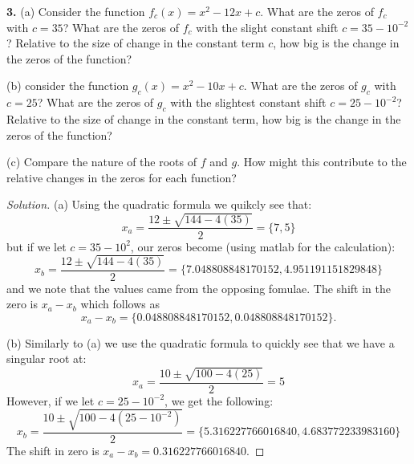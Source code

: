 \documentclass[12pt]{amsart}
\newenvironment{solution}
{\begin{proof}[Solution]}
{\end{proof}}
\begin{document}
\begin{onehalfspace}
        \textbf{3.} (a) Consider the function $f_c(x) = x^2 -12x + c$. What are the zeros of $f_c$ with $c = 35$? What
        are the zeros of $f_c$ with the slight constant shift $c = 35 - 10^{-2}$? Relative to the size of change in
        the constant term $c$, how big is the change in the zeros of the function?

        (b) consider the function $g_c(x) = x^2 - 10x + c$. What are the zeros of $g_c$ with $c = 25$? What are the
        zeros of $g_c$ with the slightest constant shift $c = 25 - 10^{-2}$? Relative to the size of change in the
        constant term, how big is the change in the zeros of the function?

        (c) Compare the nature of the roots of $f$ and $g$. How might this contribute to the relative changes in the
        zeros for each function?
        \begin{solution}
            (a) Using the quadratic formula we quikcly see that:
            \begin{displaymath}
                x_a = \frac{12 \pm \sqrt{144 - 4(35)}}{2} = \{7, 5\}
            \end{displaymath}
            but if we let $c = 35-10^2$, our zeros become (using matlab for the calculation):
            \begin{displaymath}
                x_b = \frac{12 \pm \sqrt{144 - 4(35)}}{2} = \{7.048808848170152,4.951191151829848\}
            \end{displaymath}
            and we note that the values came from the opposing fomulae. The shift in the zero is $x_a - x_b$ which
            follows as
            \begin{displaymath}
                x_a - x_b = \{0.048808848170152,0.048808848170152\}.
            \end{displaymath}

            (b) Similarly to (a) we use the quadratic formula to quickly see that we have a singular root at:
            \begin{displaymath}
                x_a = \frac{10\pm\sqrt{100 - 4(25)}}{2} = 5
            \end{displaymath}
            However, if we let $c = 25-10^{-2}$, we get the following:
            \begin{displaymath}
                x_b = \frac{10\pm\sqrt{100 - 4(25-10^{-2})}}{2} = \{5.316227766016840, 4.683772233983160\}
            \end{displaymath}
            The shift in zero is $x_a - x_b = 0.316227766016840$.


\end{solution}
\end{onehalfspace}
\end{document}
